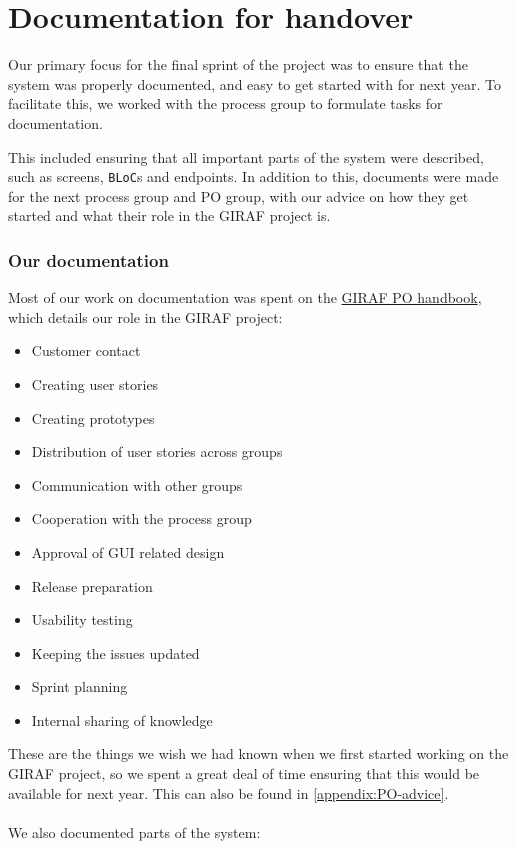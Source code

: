\section{Documentation for handover}
Our primary focus for the final sprint of the project was to ensure that the system was properly documented, and easy to get started with for next year.
To facilitate this, we worked with the process group to formulate tasks for documentation.

This included ensuring that all important parts of the system were described, such as screens, \texttt{BLoC}s and endpoints.
In addition to this, documents were made for the next process group and PO group, with our advice on how they get started and what their role in the GIRAF project is.

\subsubsection{Our documentation}
Most of our work on documentation was spent on the \href{https://github.com/aau-giraf/wiki/blob/master/advice_for_future_giraf/PO_advice.md}{GIRAF PO handbook}, which details our role in the GIRAF project:

\begin{itemize}
    \item Customer contact
    \item Creating user stories 
    \item Creating prototypes
    \item Distribution of user stories across groups
    \item Communication with other groups
    \item Cooperation with the process group
    \item Approval of GUI related design
    \item Release preparation
    \item Usability testing
    \item Keeping the issues updated
    \item Sprint planning
    \item Internal sharing of knowledge
\end{itemize}
\noindent
These are the things we wish we had known when we first started working on the GIRAF project, so we spent a great deal of time ensuring that this would be available for next year.
This can also be found in \autoref{appendix:PO-advice}.
\\\\
We also documented parts of the system:

